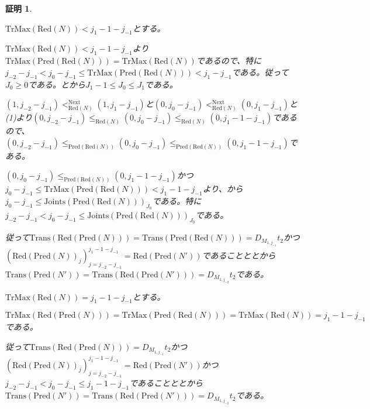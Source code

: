 \documentclass[dvipdfmx,uplatex]{jsarticle}
\theoremstyle{customnonumberbreakfortheorem}
\theoremstyle{customnonumberbreakforproof}
\newtheorem{hideableproof}{証明}
\begin{document}
\begin{hideableproof}
\begin{indented}
		\item \(\textrm{TrMax}(\textrm{Red}(N)) < j_1-1-j_{-1}\)とする。
		\begin{indented}
			\item \(\textrm{TrMax}(\textrm{Red}(N)) < j_1-1-j_{-1}\)より\(\textrm{TrMax}(\textrm{Pred}(\textrm{Red}(N))) = \textrm{TrMax}(\textrm{Red}(N))\)であるので、特に\(j_{-2}-j_{-1} < j_0-j_{-1} \leq \textrm{TrMax}(\textrm{Pred}(\textrm{Red}(N))) < j_1-j_{-1}\)である。従って\(J_0 \geq 0\)である。とから\(J_1-1 \leq J_0 \leq J_1\)である。
			\item \((1,j_{-2}-j_{-1}) <_{\textrm{Red}(N)}^{\textrm{Next}} (1,j_1-j_{-1})\)と\((0,j_0-j_{-1}) <_{\textrm{Red}(N)}^{\textrm{Next}} (0,j_1-j_{-1})\)と (1)より\((0,j_{-2}-j_{-1}) \leq_{\textrm{Red}(N)} (0,j_0-j_{-1}) \leq_{\textrm{Red}(N)} (0,j_1-1-j_{-1})\)であるので、\((0,j_{-2}-j_{-1}) \leq_{\textrm{Pred}(\textrm{Red}(N))} (0,j_0-j_{-1}) \leq_{\textrm{Pred}(\textrm{Red}(N))} (0,j_1-1-j_{-1})\)である。
			\item \((0,j_0-j_{-1}) \leq_{\textrm{Pred}(\textrm{Red}(N))} (0,j_1-1-j_{-1})\)かつ\(j_0-j_{-1} \leq \textrm{TrMax}(\textrm{Pred}(\textrm{Red}(N))) < j_1-1-j_{-1}\)より、から\(j_0-j_{-1} \leq \textrm{Joints}(\textrm{Pred}(\textrm{Red}(N)))_{J_0}\)である。特に\(j_{-2}-j_{-1} < j_0-j_{-1} \leq \textrm{Joints}(\textrm{Pred}(\textrm{Red}(N)))_{J_0}\)である。
			\item 従って\(\textrm{Trans}(\textrm{Red}(\textrm{Pred}(N))) = \textrm{Trans}(\textrm{Pred}(\textrm{Red}(N))) = D_{M_{1,j_{-1}}} t_2\)かつ\((\textrm{Red}(\textrm{Pred}(N))_j)_{j=j_{-2}-j_{-1}}^{j_1-1-j_{-1}} = \textrm{Red}(\textrm{Pred}(N'))\)であることととから\(\textrm{Trans}(\textrm{Pred}(N')) = \textrm{Trans}(\textrm{Red}(\textrm{Pred}(N'))) = D_{M_{1,j_{-2}}} t_2\)である。
		\end{indented}
		\item \(\textrm{TrMax}(\textrm{Red}(N)) = j_1-1-j_{-1}\)とする。
		\begin{indented}
			\item \(\textrm{TrMax}(\textrm{Red}(\textrm{Pred}(N))) = \textrm{TrMax}(\textrm{Pred}(\textrm{Red}(N))) = \textrm{TrMax}(\textrm{Red}(N)) = j_1-1-j_{-1}\)である。
			\item 従って\(\textrm{Trans}(\textrm{Red}(\textrm{Pred}(N))) = D_{M_{1,j_{-1}}} t_2\)かつ\((\textrm{Red}(\textrm{Pred}(N))_j)_{j=j_{-2}-j_{-1}}^{j_1-1-j_{-1}} = \textrm{Red}(\textrm{Pred}(N'))\)かつ\(j_{-2}-j_{-1} < j_0-j_{-1} \leq j_1-1-j_{-1}\)であることととから\(\textrm{Trans}(\textrm{Pred}(N')) = \textrm{Trans}(\textrm{Red}(\textrm{Pred}(N'))) = D_{M_{1,j_{-2}}} t_2\)である。
		\end{indented}
	\end{indented}
\end{hideableproof}
\end{document}
